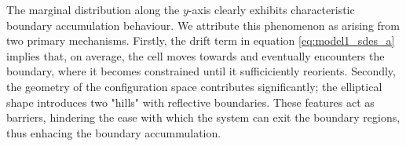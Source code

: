 The marginal distribution along the $y$-axis clearly exhibits characteristic boundary accumulation behaviour. 
We attribute this phenomenon as arising from two primary mechanisms. Firstly, the drift term in equation \eqref{eq:model1_sdes_a} 
implies that, on average, the cell moves towards and eventually encounters the boundary, where it becomes constrained 
until it sufficiciently reorients. Secondly, the geometry of the configuration space contributes significantly; the elliptical
shape introduces two "hills" with reflective boundaries. These features act as barriers, hindering the ease with 
which the system can exit the boundary regions, thus enhacing the boundary accummulation.